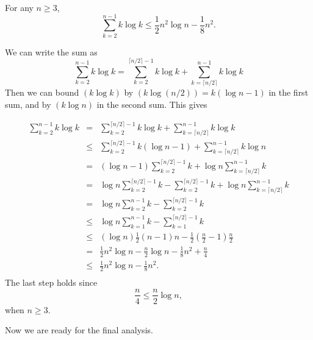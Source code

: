 \begin{lem}
For any $n\geq 3$, 
$$\sum_{k=2}^{n-1} k\log k \leq \frac{1}{2}n^2\log n - \frac{1}{8}n^2.$$
\begin{pf}
We can write the sum as
$$\sum_{k=2}^{n-1} k\log k =
\sum_{k=2}^{\lceil n/2 \rceil-1} k\log k +
\sum_{k=\lceil n/2 \rceil}^{n-1} k\log k $$
Then we can bound $(k\log k)$ by $(k\log(n/2))=k(\log n - 1)$ in the first sum, 
and by $(k\log n)$ in the second sum.
This gives 

\begin{eqnarray*}
\sum_{k=2}^{n-1} k\log k &=&
\sum_{k=2}^{\lceil n/2 \rceil-1} k\log k + 
\sum_{k=\lceil n/2 \rceil}^{n-1} k\log k\\
&\leq& \sum_{k=2}^{\lceil n/2 \rceil-1} k(\log n -1) + 
\sum_{k=\lceil n/2 \rceil}^{n-1} k\log n\\
&=&(\log n - 1)\sum_{k=2}^{\lceil n/2 \rceil-1} k +
\log n\sum_{k=\lceil n/2 \rceil}^{n-1} k\\
&=&\log n\sum_{k=2}^{\lceil n/2 \rceil-1} k -
\sum_{k=2}^{\lceil n/2 \rceil-1} k +
\log n\sum_{k=\lceil n/2 \rceil}^{n-1} k\\
&=&\log n \sum_{k=2}^{n-1} k - \sum_{k=2}^{\lceil n/2 \rceil-1} k\\
&\leq&\log n \sum_{k=1}^{n-1} k - \sum_{k=1}^{\lceil n/2 \rceil-1} k\\
&\leq&(\log n) \frac{1}{ 2}(n-1)n  - \frac{1}{ 2}(\frac{n}{ 2}-1)\frac{n}{ 2}\\
&=&\frac{1}{ 2}n^2\log n  - \frac{n}{ 2}\log n- \frac{1}{ 8}n^2+ \frac{n}{ 4}\\
&\leq&\frac{1}{ 2}n^2\log n  - \frac{1}{ 8}n^2.\\
\end{eqnarray*}
The last step holds since 
$$\frac{n}{ 4}\leq \frac{n}{ 2}\log n,$$
when $n\geq 3$.
\end{pf}
\end{lem}

\newpage

Now we are ready for the final analysis.

